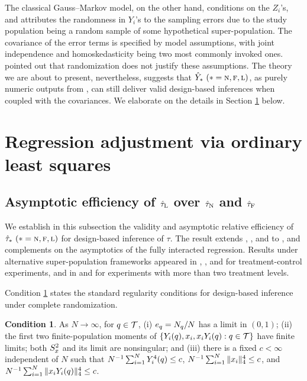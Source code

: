 \documentclass[11pt]{article}
\theoremstyle{definition}
\newtheorem{condition}{Condition}
\begin{document}
The classical Gauss--Markov model, on the other hand, conditions on the $Z_i$'s, and attributes the randomness in $Y_i$'s to the sampling errors due to the study population being a random sample of some hypothetical super-population.  The covariance of the error terms is specified by model assumptions, with joint independence and homoskedasticity being two most commonly invoked ones.  \cite{Freedman08a} pointed out that randomization does not justify these assumptions.  The theory we are about to present, nevertheless, suggests that $\hat Y_* \ (* =\textsc{n}, \textsc{f}, \textsc{l})$, as purely numeric outputs from \ols, can still deliver valid design-based inferences when coupled with the \ehws covariances.  We elaborate on the details in Section \ref{sec:reg} below. 

\section{Regression adjustment via ordinary least squares}
\label{sec:reg}  

\subsection{Asymptotic efficiency of $\hat\tau_\textup{L}$ over  $\hat\tau_\textup{N}$ and  $\hat\tau_\textup{F}$}


We establish in this subsection the validity and asymptotic relative efficiency of $\hat\tau_* \ (* =\textsc{n}, \textsc{f}, \textsc{l})$ for design-based inference of $\tau$. 
The result extends \cite{Fisher35}, \cite{Freedman08a}, and \cite{Lin13} to \mes, and complements \cite{Freedman2008b} on the asymptotics of the fully interacted regression. 
Results under alternative super-population frameworks appeared in \cite{tsia}, \cite{bugni2018inference}, and \cite{negi2021revisiting}  for treatment-control experiments, and in \cite{bugni2019} and \cite{ye} for experiments with more than two treatment levels. 


Condition \ref{asym} states the standard regularity conditions for 
design-based inference under complete randomization. 

\begin{condition}\label{asym}
As $N\to \infty$, for $q\in\mathcal{T}$, 
(i) $e_q   = N_q/N$ has a limit in $(0,1)$;
%
(ii) the first two finite-population moments of $\{Y_i(q), x_i, x_iY_i(q): q \in \mathcal{T} \}$ have finite limits;
both $S^2_{x}$ and its limit are nonsingular;
%
and (iii) 
there is a fixed $c < \infty$ independent of $N$ such that 
$N^{-1}\sum_{i=1}^N   Y_i^4(q)   \leq c$, $N^{-1}\sum_{i=1}^N  \|x_i\|_4^4 \leq c$, and $N^{-1}\sum_{i=1}^N  \|x_iY_i(q)\|_4^4 \leq c$.
\end{condition}
\end{document}
